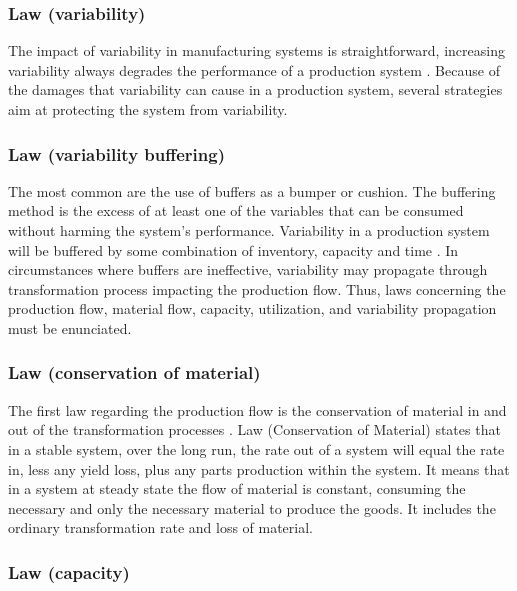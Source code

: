\documentclass{article}
\begin{document}
\subsubsection{Law (variability)}
\label{sec:org7d3de97}

The impact of variability in manufacturing systems is straightforward, increasing variability always degrades the performance of a production system \citep{Hopp2001}.
Because of the damages that variability can cause in a production system, several strategies aim at protecting the system from variability.

\subsubsection{Law (variability buffering)}
\label{sec:orgd9084f7}

The most common are the use of buffers as a bumper or cushion.
The buffering method is the excess of at least one of the variables that can be consumed without harming the system's performance.
Variability in a production system will be buffered by some combination of inventory, capacity and time \citep{Hopp2001}.
In circumstances where buffers are ineffective, variability may propagate through transformation process impacting the production flow.
Thus, laws concerning the production flow, material flow, capacity, utilization, and variability propagation must be enunciated.

\subsubsection{Law (conservation of material)}
\label{sec:org286e063}

The first law regarding the production flow is the conservation of material in and out of the transformation processes \citep{Hopp2001}.
Law (Conservation of Material) states that in a stable system, over the long run, the rate out of a system will equal the rate in, less any yield loss, plus any parts production within the system.
It means that in a system at steady state the flow of material is constant, consuming the necessary and only the necessary material to produce the goods.
It includes the ordinary transformation rate and loss of material.

\subsubsection{Law (capacity)}
\label{sec:orgb1677aa}
\end{document}
